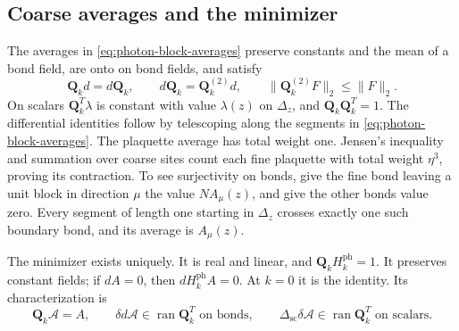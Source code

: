 \documentclass[11pt,letterpaper,reqno]{amsart}
\begin{document}
\subsection{Coarse averages and the minimizer}\label{subsec:photon-Landau-minimizer}
The averages in \eqref{eq:photon-block-averages} preserve
constants and the mean of a bond field, are onto on bond fields, and
satisfy
\begin{equation}\label{eq:photon-averaging-identities}
 \mathbf Q_kd=d\mathbf Q_k,\qquad
 d\mathbf Q_k=\mathbf Q_k^{(2)}d,\qquad
 \|\mathbf Q_k^{(2)}F\|_2\le\|F\|_2.
\end{equation}
On scalars $\mathbf Q_k^T\lambda$ is constant with value $\lambda(z)$
on $\Delta_z$, and $\mathbf Q_k\mathbf Q_k^T=1$.
The differential identities follow by telescoping along the segments
in \eqref{eq:photon-block-averages}. The plaquette average has total
weight one. Jensen's inequality and summation over coarse sites count
each fine plaquette with total weight $\eta^3$, proving its contraction.
To see surjectivity on bonds, give the fine bond leaving a unit block
in direction $\mu$ the value $N A_\mu(z)$, and give the other bonds
value zero. Every segment of length one starting in $\Delta_z$ crosses
exactly one such boundary bond, and its average is $A_\mu(z)$.

\begin{proposition}\label{prop:photon-Landau-minimizer}
The minimizer exists uniquely. It is real and linear, and
$\mathbf Q_kH_k^{\mathrm{ph}}=1$. It preserves constant fields;
if $dA=0$, then $dH_k^{\mathrm{ph}}A=0$. At $k=0$ it is the identity.
Its characterization is
\begin{equation}\label{eq:photon-minimizer-Euler}
 \mathbf Q_k\mathscr A=A,\qquad
 \delta d\mathscr A\in\operatorname{ran}\mathbf Q_k^T
     \text{ on bonds},\qquad
 \Delta_{\mathrm{sc}}\delta\mathscr A
      \in\operatorname{ran}\mathbf Q_k^T\text{ on scalars}.
\end{equation}
\end{proposition}
\end{document}
